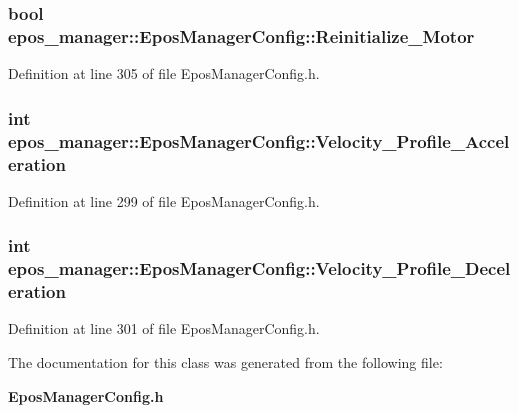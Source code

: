 \subsubsection[{\-Reinitialize\-\_\-\-Motor}]{\setlength{\rightskip}{0pt plus 5cm}bool {\bf epos\-\_\-manager\-::\-Epos\-Manager\-Config\-::\-Reinitialize\-\_\-\-Motor}}\label{classepos__manager_1_1EposManagerConfig_a78652f039a73bb2bb31dfa4c06f9aa63}


\-Definition at line 305 of file \-Epos\-Manager\-Config.\-h.

\subsubsection[{\-Velocity\-\_\-\-Profile\-\_\-\-Acceleration}]{\setlength{\rightskip}{0pt plus 5cm}int {\bf epos\-\_\-manager\-::\-Epos\-Manager\-Config\-::\-Velocity\-\_\-\-Profile\-\_\-\-Acceleration}}\label{classepos__manager_1_1EposManagerConfig_a9f0a78e59a482931f73fb9e3a8a731a1}


\-Definition at line 299 of file \-Epos\-Manager\-Config.\-h.

\subsubsection[{\-Velocity\-\_\-\-Profile\-\_\-\-Deceleration}]{\setlength{\rightskip}{0pt plus 5cm}int {\bf epos\-\_\-manager\-::\-Epos\-Manager\-Config\-::\-Velocity\-\_\-\-Profile\-\_\-\-Deceleration}}\label{classepos__manager_1_1EposManagerConfig_a6ee05d0923ef2700655cb4c6d695edba}


\-Definition at line 301 of file \-Epos\-Manager\-Config.\-h.



\-The documentation for this class was generated from the following file\-:\begin{DoxyCompactItemize}
\item 
{\bf \-Epos\-Manager\-Config.\-h}\end{DoxyCompactItemize}
